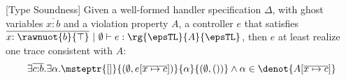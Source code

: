 \begin{theorem}\label{theorem:sound}[Type Soundness] Given
  a well-formed handler specification $\Delta$, with ghost variables $\overline{x{:}b}$ and a violation property $A$, a controller $e$ that satisfies
  $\overline{x{:\rawnuot{b}{\top}}} ~|~ \emptyset \vdash e : \rg{\epsTL}{A}{\epsTL}$, then $e$ at least realize one trace consistent with $A$:
 {\small\begin{align*} \exists
    \overline{c{:}b}. \exists \alpha. \msteptr{[]}{(\emptyset,
      e[\overline{x\mapsto c}])}{\alpha}{(\emptyset, ())} \land \alpha \in
    \denot{A[\overline{x\mapsto c}]}
\end{align*}}
\end{theorem}






